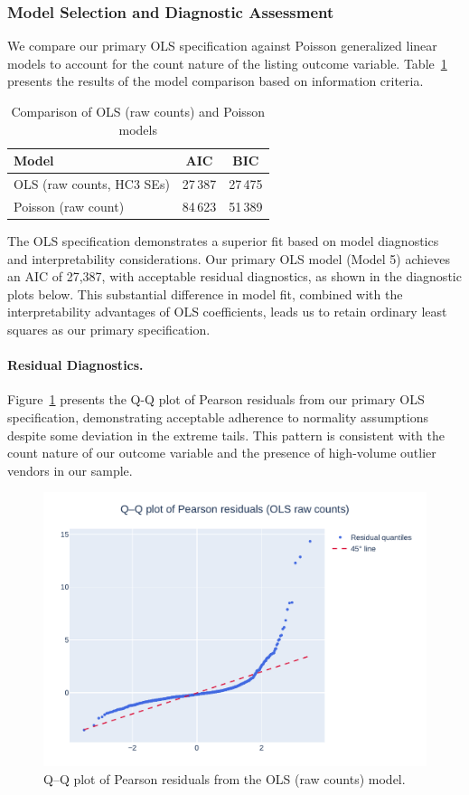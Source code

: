 \documentclass{article}
\begin{document}
\subsubsection{Model Selection and Diagnostic Assessment}

We compare our primary OLS specification against Poisson generalized linear models to account for the count nature of the listing outcome variable. Table~\ref{tab:robust_models} presents the results of the model comparison based on information criteria.

\begin{table}[ht]
  \centering
  \begin{tabular}{lcc}
    \toprule
    Model & AIC & BIC\\
    \midrule
    OLS (raw counts, HC3 SEs) & 27\,387 & 27\,475\\
    Poisson (raw count)       & 84\,623 & 51\,389\\
    \bottomrule
  \end{tabular}
  \caption{Comparison of OLS (raw counts) and Poisson models}
  \label{tab:robust_models}
\end{table}

The OLS specification demonstrates a superior fit based on model diagnostics and interpretability considerations. Our primary OLS model (Model 5) achieves an AIC of 27,387, with acceptable residual diagnostics, as shown in the diagnostic plots below. This substantial difference in model fit, combined with the interpretability advantages of OLS coefficients, leads us to retain ordinary least squares as our primary specification.

\paragraph{Residual Diagnostics.} Figure~\ref{fig:qq_logols} presents the Q-Q plot of Pearson residuals from our primary OLS specification, demonstrating acceptable adherence to normality assumptions despite some deviation in the extreme tails. This pattern is consistent with the count nature of our outcome variable and the presence of high-volume outlier vendors in our sample.

\begin{figure}[ht]
  \centering
  \includegraphics[width=.6\textwidth]{qq_plot_rawols.pdf}
  \caption{Q–Q plot of Pearson residuals from the OLS (raw counts) model.}
  \label{fig:qq_logols}
\end{figure}
\end{document}

